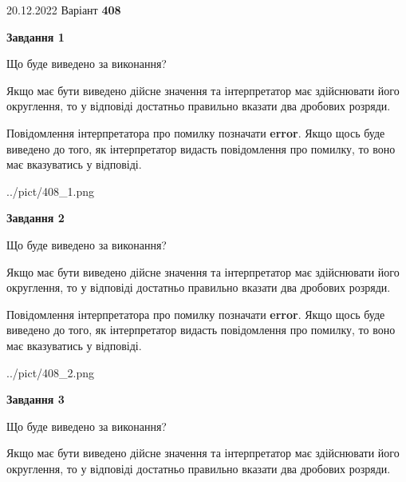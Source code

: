 \documentclass[12pt, ukrainian]{article}
\begin{document}
{20.12.2022 Варіант \No \textbf { 408 }\par}
{
\begin {Large}

{\begin {center}\textbf{Завдання 1}\end {center}}\par
Що буде виведено за виконання? \par

Якщо має бути виведено дійсне значення та інтерпретатор має здійснювати його округлення, 
то у відповіді достатньо правильно вказати два дробових розряди.

Повідомлення інтерпретатора про помилку позначати \textbf{error}.
Якщо щось буде виведено до того, як інтерпретатор видасть повідомлення про помилку, 
то воно має вказуватись у відповіді. \par

\begin{center}
	{../pict/408_1.png}
\end{center}
\newpage

{\begin {center}\textbf{Завдання 2}\end {center}}\par
Що буде виведено за виконання? \par

Якщо має бути виведено дійсне значення та інтерпретатор має здійснювати його округлення, 
то у відповіді достатньо правильно вказати два дробових розряди.

Повідомлення інтерпретатора про помилку позначати \textbf{error}.
Якщо щось буде виведено до того, як інтерпретатор видасть повідомлення про помилку, 
то воно має вказуватись у відповіді. \par

\begin{center}
	{../pict/408_2.png}
\end{center}
\newpage

{\begin {center}\textbf{Завдання 3}\end {center}}\par
Що буде виведено за виконання? \par

Якщо має бути виведено дійсне значення та інтерпретатор має здійснювати його округлення, 
то у відповіді достатньо правильно вказати два дробових розряди.


\end{Large}}
\end{document}
